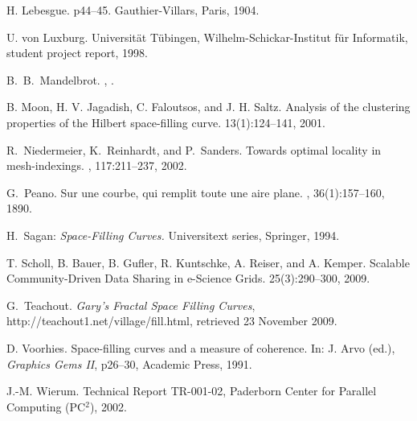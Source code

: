 \documentclass[11pt,a4paper]{article}
\begin{document}
\begin{thebibliography}{10}
H. Lebesgue.
\newblock p44--45. Gauthier-Villars, Paris, 1904.

U. von Luxburg.
\newblock Universit\"at T\"ubingen, Wilhelm-Schickar-Institut f\"ur Informatik, student project report, 1998.

B.~B.~Mandelbrot.
,
.

B. Moon, H. V. Jagadish, C. Faloutsos, and J. H. Saltz.
\newblock Analysis of the clustering properties of the Hilbert space-filling curve.
 13(1):124--141, 2001.

R.~Niedermeier, K.~Reinhardt, and P.~Sanders.
\newblock Towards optimal locality in mesh-indexings.
, 117:211--237, 2002.

G.~Peano.
\newblock Sur une courbe, qui remplit toute une aire plane.
, 36(1):157--160, 1890.

H.~Sagan:
{\em Space-Filling Curves.}
Universitext series, Springer, 1994.

T. Scholl, B. Bauer, B. Gufler, R. Kuntschke, A. Reiser, and A. Kemper.
\newblock Scalable Community-Driven Data Sharing in e-Science Grids.
 25(3):290--300, 2009.

G.~Teachout.
{\em Gary's Fractal Space Filling Curves},
http://teachout1.net/village/fill.html,
retrieved 23 November 2009.

D. Voorhies.
\newblock Space-filling curves and a measure of coherence.
\newblock In: J. Arvo (ed.), {\em Graphics Gems II}, p26--30, Academic Press, 1991.

J.-M. Wierum.
\newblock Technical Report TR-001-02, Paderborn Center for Parallel Computing
  (PC$^2$), 2002.

\end{thebibliography}
\end{document}

